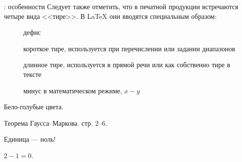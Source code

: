 \documentclass{beamer}
\begin{document}
\begin{frame}[fragile]{\insertsubsection{}: особенности}
\vspace{-2ex}
\small
Следует также отметить, что в печатной продукции встречаются четыре
вида <<тире>>. В \LaTeX{} они вводятся специальным образом:
\vspace{-1ex}
\begin{description}
  \item[\keystrokebftt{-}] дефис
  \item[\keystrokebftt{-}\keystrokebftt{-}] короткое тире, используется
    при перечислении или задании диапазонов
  \item[\keystrokebftt{-}\keystrokebftt{-}\keystrokebftt{-}] длинное тире,
    используется в прямой речи или как собственно тире в тексте
  \item[\keystrokebftt{\$}\keystrokebftt{-}\keystrokebftt{\$}] минус в
    математическом режиме, $x - y$
\end{description}
\begin{exampletwouptiny}
Бело-голубые цвета.

Теорема Гаусса--Маркова. стр. 2--6.

Единица --- ноль!

$2 - 1 = 0$.
\end{exampletwouptiny}
\end{frame}
\end{document}

